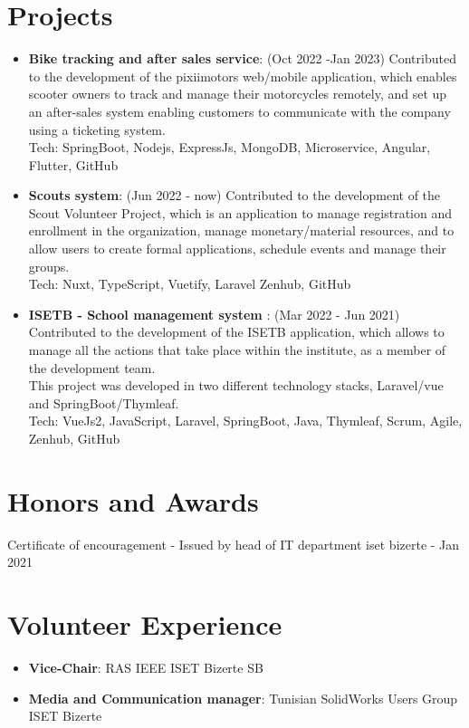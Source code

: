 \documentclass[a4paper,20pt]{article}
\newcommand{\resumeItem}[2]{
  \item\small{
    \textbf{#1}{: #2 \vspace{-2pt}}
  }
}
\newcommand{\resumeSubItem}[2]{\resumeItem{#1}{#2}\vspace{-3pt}}
\newcommand{\resumeSubHeadingListStart}{\begin{itemize}[leftmargin=*]}
\newcommand{\resumeSubHeadingListEnd}{\end{itemize}}
\begin{document}
\vspace{-5pt}
\section{Projects}
\resumeSubHeadingListStart
\resumeSubItem{Bike tracking and after sales service}{(Oct 2022 -Jan 2023)
 Contributed to the development of the pixiimotors web/mobile application, which enables scooter owners to track and manage their motorcycles remotely, and set up an after-sales system enabling customers to communicate with the company using a ticketing system.
\\ Tech: SpringBoot, Nodejs, ExpressJs, MongoDB, Microservice, Angular, Flutter, GitHub}
\vspace{2pt}
\resumeSubItem{Scouts system}{(Jun 2022 - now)
 Contributed to the development of the Scout Volunteer Project, which is an application to manage registration and enrollment in the organization, manage monetary/material resources, and to allow users to create formal applications, schedule events and manage their groups.
\\ Tech: Nuxt, TypeScript, Vuetify, Laravel Zenhub, GitHub }
\vspace{2pt}
\resumeSubItem{ISETB - School management system
 }{(Mar 2022 - Jun 2021) 
 Contributed to the development of the ISETB application, which allows to manage all the actions that take place within the institute, as a member of the development team.
 \\\small{This project was developed in two different technology stacks, Laravel/vue and SpringBoot/Thymleaf.}
\\ Tech: VueJs2, JavaScript, Laravel, SpringBoot, Java, Thymleaf, Scrum, Agile, Zenhub, GitHub }

\resumeSubHeadingListEnd

\section{Honors and Awards}
\begin{description}[font=$\bullet$]
\item {Certificate of encouragement - Issued by head of IT department iset bizerte - Jan 2021}
\end{description}

\vspace{-2pt}
\section{Volunteer Experience}
  \resumeSubHeadingListStart
	\resumeItem
    {Vice-Chair}
    {RAS IEEE ISET Bizerte SB}
    \resumeItem
    {Media and Communication manager}
    {Tunisian SolidWorks
Users Group ISET Bizerte}
   
\vspace{5pt}
\resumeSubHeadingListEnd
\end{document}
